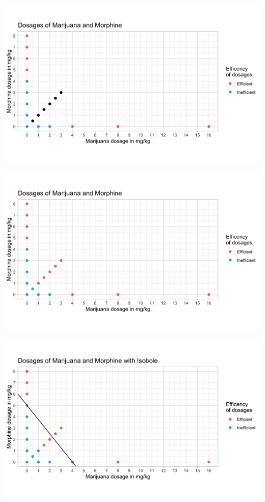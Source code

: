\documentclass[14pt]{beamer}
\begin{document}
\begin{frame}
\begin{center}
\includegraphics[scale=0.23]{img6.png}
\end{center}
\end{frame}

\begin{frame}
\begin{center}
\includegraphics[scale=0.23]{img7.png}
\end{center}
\end{frame}

\begin{frame}
\begin{center}
\includegraphics[scale=0.23]{img8.png}
\end{center}
\end{frame}
\end{document}
